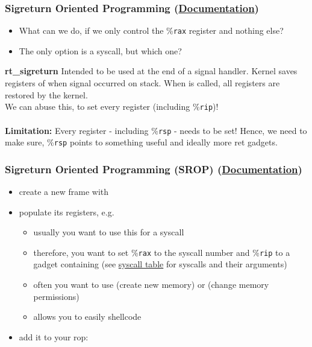 \documentclass[aspectratio=169]{beamer}
\newcommand{\reg}[1]{\%\texttt{#1}}
\newcommand{\docl}[1]{(\textbf{\href{#1}{Documentation}})}
\begin{document}
{\begin{frame}[fragile]
    \frametitle{Sigreturn Oriented Programming \docl{http://docs.pwntools.com/en/stable/rop/srop.html}}
    \begin{itemize}
        \item What can we do, if we only control the \reg{rax} register and nothing else?
        \item The only option is a syscall, but which one?
    \end{itemize}
    \begin{alertblock}{\textbf{rt\_sigreturn}}
        Intended to be used at the end of a signal handler. Kernel saves registers of when signal occurred on stack.
        When  is called, all registers are restored by the kernel.\\
        We can abuse this, to set every register (including \reg{rip})!\\~\\
        \textbf{Limitation:} Every register - including \reg{rsp} - needs to be set!
        Hence, we need to make sure, \reg{rsp} points to something useful and ideally more ret gadgets.
    \end{alertblock}
\end{frame}

\begin{frame}[fragile]
    \frametitle{Sigreturn Oriented Programming (SROP) \docl{http://docs.pwntools.com/en/stable/rop/srop.html}}
    \begin{itemize}
        \item create a new frame with 
        \item populate its registers, e.g. 
        \begin{itemize}
            \item usually you want to use this for a syscall
            \item therefore, you want to set \reg{rax} to the syscall number and \reg{rip} to a gadget containing  (see \href{https://filippo.io/linux-syscall-table/}{syscall table} for syscalls and their arguments)
            \item often you want to use  (create new memory) or  (change memory permissions)
            \item allows you to easily shellcode
        \end{itemize}
        \item add it to your rop: 
    \end{itemize}


\end{frame}}
\end{document}
